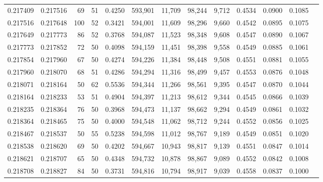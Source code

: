 \begin{tabular}{rrrrrrrrrrrrr}
0.217409 & 0.217516 &    69 &  51 &                                     0.4250 & 593,901 &  11,709 &  98,244 &   9,712 & 0.4534 & 0.0900 & 0.1085 \\
0.217516 & 0.217648 &   100 &  52 &                                     0.3421 & 594,001 &  11,609 &  98,296 &   9,660 & 0.4542 & 0.0895 & 0.1075 \\
0.217649 & 0.217773 &    86 &  52 &                                     0.3768 & 594,087 &  11,523 &  98,348 &   9,608 & 0.4547 & 0.0890 & 0.1067 \\
0.217773 & 0.217852 &    72 &  50 &                                     0.4098 & 594,159 &  11,451 &  98,398 &   9,558 & 0.4549 & 0.0885 & 0.1061 \\
0.217854 & 0.217960 &    67 &  50 &                                     0.4274 & 594,226 &  11,384 &  98,448 &   9,508 & 0.4551 & 0.0881 & 0.1055 \\
0.217960 & 0.218070 &    68 &  51 &                                     0.4286 & 594,294 &  11,316 &  98,499 &   9,457 & 0.4553 & 0.0876 & 0.1048 \\
0.218071 & 0.218164 &    50 &  62 &                                     0.5536 & 594,344 &  11,266 &  98,561 &   9,395 & 0.4547 & 0.0870 & 0.1044 \\
0.218164 & 0.218233 &    53 &  51 &                                     0.4904 & 594,397 &  11,213 &  98,612 &   9,344 & 0.4545 & 0.0866 & 0.1039 \\
0.218235 & 0.218364 &    76 &  50 &                                     0.3968 & 594,473 &  11,137 &  98,662 &   9,294 & 0.4549 & 0.0861 & 0.1032 \\
0.218364 & 0.218465 &    75 &  50 &                                     0.4000 & 594,548 &  11,062 &  98,712 &   9,244 & 0.4552 & 0.0856 & 0.1025 \\
0.218467 & 0.218537 &    50 &  55 &                                     0.5238 & 594,598 &  11,012 &  98,767 &   9,189 & 0.4549 & 0.0851 & 0.1020 \\
0.218538 & 0.218620 &    69 &  50 &                                     0.4202 & 594,667 &  10,943 &  98,817 &   9,139 & 0.4551 & 0.0847 & 0.1014 \\
0.218621 & 0.218707 &    65 &  50 &                                     0.4348 & 594,732 &  10,878 &  98,867 &   9,089 & 0.4552 & 0.0842 & 0.1008 \\
0.218708 & 0.218827 &    84 &  50 &                                     0.3731 & 594,816 &  10,794 &  98,917 &   9,039 & 0.4558 & 0.0837 & 0.1000 \\

\end{tabular}
